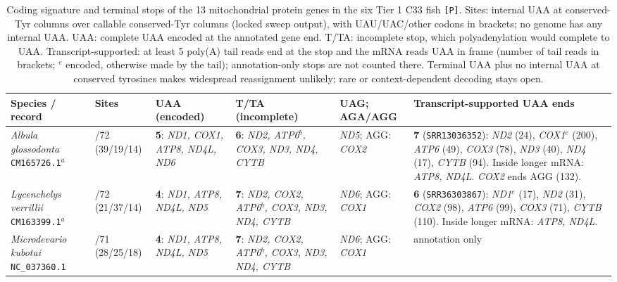 \documentclass[11pt, a4paper]{article}
\begin{document}
\begin{table}[htbp]
\centering
\scriptsize
\setlength{\tabcolsep}{3pt}
\renewcommand{\arraystretch}{1.25}
\caption{Coding signature and terminal stops of the 13 mitochondrial protein genes in the six Tier 1 C33 fish \texttt{[P]}. Sites: internal UAA at conserved-Tyr columns over callable conserved-Tyr columns (locked sweep output), with UAU/UAC/other codons in brackets; no genome has any internal UAA. UAA: complete UAA encoded at the annotated gene end. T/TA: incomplete stop, which polyadenylation would complete to UAA. Transcript-supported: at least 5 poly(A) tail reads end at the stop and the mRNA reads UAA in frame (number of tail reads in brackets; $^{e}$ encoded, otherwise made by the tail); annotation-only stops are not counted there. Terminal UAA plus no internal UAA at conserved tyrosines makes widespread reassignment unlikely; rare or context-dependent decoding stays open.}\label{tab:sixfish}
\begin{tabular}{
  >{\raggedright\arraybackslash}p{2.55cm}
  >{\raggedright\arraybackslash}p{1.45cm}
  >{\raggedright\arraybackslash}p{2.35cm}
  >{\raggedright\arraybackslash}p{2.75cm}
  >{\raggedright\arraybackslash}p{1.75cm}
  >{\raggedright\arraybackslash}p{3.8cm}
}
\toprule
\textbf{Species / record} & \textbf{Sites} & \textbf{UAA (encoded)} & \textbf{T/TA (incomplete)} & \textbf{UAG; AGA/AGG} & \textbf{Transcript-supported UAA ends} \\
\midrule
\textit{Albula glossodonta} \texttt{CM165726.1}$^{a}$ & 0/72 (39/19/14) & \textbf{5}: \textit{ND1, COX1, ATP8, ND4L, ND6} & \textbf{6}: \textit{ND2, ATP6$^{b}$, COX3, ND3, ND4, CYTB} & \textit{ND5}; AGG: \textit{COX2} & \textbf{7} (\texttt{SRR13036352}): \textit{ND2} (24), \textit{COX1}$^{e}$ (200), \textit{ATP6} (49), \textit{COX3} (78), \textit{ND3} (40), \textit{ND4} (17), \textit{CYTB} (94). Inside longer mRNA: \textit{ATP8, ND4L}. \textit{COX2} ends AGG (132). \\
\textit{Lycenchelys verrillii} \texttt{CM163399.1}$^{a}$ & 0/72 (21/37/14) & \textbf{4}: \textit{ND1, ATP8, ND4L, ND5} & \textbf{7}: \textit{ND2, COX2, ATP6$^{b}$, COX3, ND3, ND4, CYTB} & \textit{ND6}; AGG: \textit{COX1} & \textbf{6} (\texttt{SRR36303867}): \textit{ND1}$^{e}$ (17), \textit{ND2} (31), \textit{COX2} (98), \textit{ATP6} (99), \textit{COX3} (71), \textit{CYTB} (110). Inside longer mRNA: \textit{ATP8, ND4L}. \\
\textit{Microdevario kubotai} \texttt{NC\_037360.1} & 0/71 (28/25/18) & \textbf{4}: \textit{ND1, ATP8, ND4L, ND5} & \textbf{7}: \textit{ND2, COX2, ATP6$^{b}$, COX3, ND3, ND4, CYTB} & \textit{ND6}; AGG: \textit{COX1} & annotation only \\

\end{tabular}
\end{table}
\end{document}
